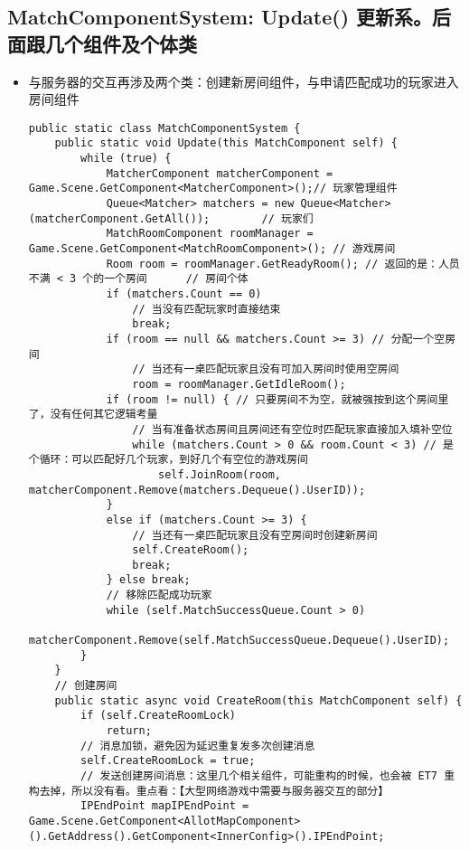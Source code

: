 \documentclass[9pt, b5paper]{article}
\begin{document}
\subsection{MatchComponentSystem: Update() 更新系。后面跟几个组件及个体类}
\label{sec-1-4}
\begin{itemize}
\item 与服务器的交互再涉及两个类：创建新房间组件，与申请匹配成功的玩家进入房间组件
\begin{verbatim}
public static class MatchComponentSystem {
    public static void Update(this MatchComponent self) {
        while (true) {
            MatcherComponent matcherComponent = Game.Scene.GetComponent<MatcherComponent>();// 玩家管理组件
            Queue<Matcher> matchers = new Queue<Matcher>(matcherComponent.GetAll());        // 玩家们
            MatchRoomComponent roomManager = Game.Scene.GetComponent<MatchRoomComponent>(); // 游戏房间
            Room room = roomManager.GetReadyRoom(); // 返回的是：人员不满 < 3 个的一个房间      // 房间个体
            if (matchers.Count == 0) 
                // 当没有匹配玩家时直接结束
                break;
            if (room == null && matchers.Count >= 3) // 分配一个空房间
                // 当还有一桌匹配玩家且没有可加入房间时使用空房间
                room = roomManager.GetIdleRoom();
            if (room != null) { // 只要房间不为空，就被强按到这个房间里了，没有任何其它逻辑考量
                // 当有准备状态房间且房间还有空位时匹配玩家直接加入填补空位
                while (matchers.Count > 0 && room.Count < 3) // 是个循环：可以匹配好几个玩家，到好几个有空位的游戏房间 
                    self.JoinRoom(room, matcherComponent.Remove(matchers.Dequeue().UserID));
            }
            else if (matchers.Count >= 3) {
                // 当还有一桌匹配玩家且没有空房间时创建新房间
                self.CreateRoom();
                break;
            } else break;
            // 移除匹配成功玩家
            while (self.MatchSuccessQueue.Count > 0) 
                matcherComponent.Remove(self.MatchSuccessQueue.Dequeue().UserID);
        }
    }
    // 创建房间
    public static async void CreateRoom(this MatchComponent self) {
        if (self.CreateRoomLock) 
            return;
        // 消息加锁，避免因为延迟重复发多次创建消息
        self.CreateRoomLock = true;
        // 发送创建房间消息：这里几个相关组件，可能重构的时候，也会被 ET7 重构去掉，所以没有看。重点看：【大型网络游戏中需要与服务器交互的部分】
        IPEndPoint mapIPEndPoint = Game.Scene.GetComponent<AllotMapComponent>().GetAddress().GetComponent<InnerConfig>().IPEndPoint;

\end{verbatim}
\end{itemize}
\end{document}
